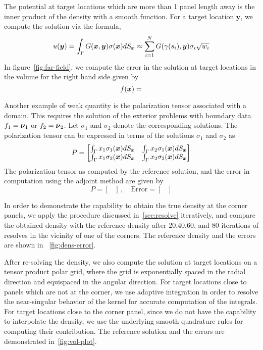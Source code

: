 The potential at target locations which are more than 1 panel length away is the inner product of the 
density with a smooth function. For a target location $\boldsymbol{y}$, we compute the solution via the formula,
\begin{equation}
u(\boldsymbol{y}) = \int_{\Gamma} G(\boldsymbol{x},\boldsymbol{y}) \sigma(\boldsymbol{x}) dS_{\boldsymbol{x}} \approx \sum_{i=1}^{N}  G(\gamma(s_{i}),\boldsymbol{y}) \sigma_{i} \sqrt{w_{i}}
\end{equation}
In figure~\cref{fig:far-field}, we compute the error in the solution at target
locations in the volume for the right hand side given by
\begin{equation}
f(\boldsymbol{x}) = 
\end{equation}

Another example of weak quantity is the polarization tensor associated with a domain. This requires the solution of the
exterior problems with boundary data $f_{1} = \boldsymbol{\nu}_{1}$ or $f_{2} = \boldsymbol{\nu}_{2}$. Let $\sigma_{1}$ and $\sigma_{2}$ denote
the corresponding solutions. The polarization tensor can be expressed in terms of the solutions $\sigma_{1}$ and $\sigma_{2}$
as
\begin{equation}
P = \begin{bmatrix}
\int_{\Gamma} x_{1} \sigma_{1}(\boldsymbol{x}) dS_{\boldsymbol{x}} & \int_{\Gamma} x_{2} \sigma_{1}(\boldsymbol{x}) dS_{\boldsymbol{x}} \\
\int_{\Gamma} x_{1} \sigma_{2}(\boldsymbol{x}) dS_{\boldsymbol{x}} & \int_{\Gamma} x_{2} \sigma_{2}(\boldsymbol{x}) dS_{\boldsymbol{x}} 
\end{bmatrix}
\end{equation}
The polarization tensor as computed by the reference solution, and the error in computation using the adjoint method
are given by
\begin{equation}
P = \begin{bmatrix}
\end{bmatrix} \, , \quad \text{Error} = 
\begin{bmatrix} 
\end{bmatrix}
\end{equation}

In order to demonstrate the capability to obtain the true density at the corner panels, we  apply the procedure
discussed in~\cref{sec:resolve} iteratively, and compare the obtained density with the reference density after 20,40,60, and
80 iterations of resolves in the vicinity of one of the corners. The reference density and the errors are shown in ~\cref{fig:dens-error}. 

After re-solving the density, we also compute the solution at target locations on a tensor product polar grid, where the grid
is exponentially spaced in the radial direction and equispaced in the angular direction. For target locations
close to panels which are not at the corner, we use adaptive integration in order to resolve the near-singular behavior of
the kernel for accurate computation of the integrals. For target locations close to the corner panel, since we do not have
the capability to interpolate the density, we use the underlying smooth quadrature rules for computing their contribution. 
The reference solution and the errors are demonstrated in~\cref{fig:vol-plot}.
